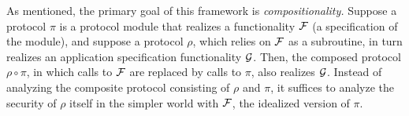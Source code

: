 As mentioned, the primary goal of this framework is
\emph{compositionality.}
Suppose a protocol $\pi$ is a protocol module that realizes a functionality $\mathcal{{F}}$ (a specification of the module),
and suppose a protocol $\rho$, which relies on $\mathcal{{F}}$ as a subroutine, in turn realizes an application specification functionality $\mathcal{{G}}$.
Then, the composed protocol $\rho \circ \pi$, in which calls to
$\mathcal{{F}}$ are replaced by calls to $\pi$, also realizes $\mathcal{{G}}$.
%
Instead of analyzing the composite protocol consisting of $\rho$ and $\pi$,
it suffices to analyze the security of $\rho$ itself in the simpler
world with $\mathcal{{F}}$, the idealized version of $\pi$.

